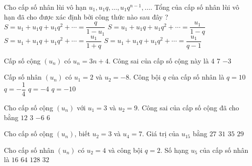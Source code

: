 \begin{ex}
Cho cấp số nhân lùi vô hạn $u_1, u_1q, \ldots, u_1q^{n-1},\ldots$. Tổng của cấp số nhân lùi vô hạn đã cho được xác định bởi công thức nào sau đây ? 
\choice
{$S=u_1+u_1q+u_1q^2+ \cdots=\dfrac{q}{1-u_1}$}
{\True $S=u_1+u_1q+u_1q^2+ \cdots=\dfrac{u_1}{1-q}$}
{$S=u_1+u_1q+u_1q^2+ \cdots=\dfrac{u_1}{1+q}$}
{$S=u_1+u_1q+u_1q^2+ \cdots=\dfrac{u_1}{q-1}$}
\end{ex}
\begin{ex}
Cấp số cộng $(u_n)$ có $u_n=3n+4$. Công sai của cấp số cộng này là
\choice
{4}
{}
{7}
{$-3$}
\end{ex}
\begin{ex}
    Cấp số nhân $(u_n)$ có $u_1=2$ và $u_2=-8$. Công bội $q$ của cấp số nhân là
\choice
{$q=10$}
{$q=-\dfrac{1}{4}$}
{\True $q=-4$}
{$q=-10$}
\end{ex}
\begin{ex}
Cho cấp số cộng $(u_n)$ với $u_1=3$ và $u_2=9$. Công sai của cấp số cộng đã cho bằng
\choice
{$12$}
{$3$}
{$-6$}
{\True $6$}
\end{ex}
\begin{ex}
Cho cấp số cộng $(u_n)$, biết $u_2=3$ và $u_4=7$. Giá trị của $u_{15}$ bằng
\choice
{$27$}
{$31$}
{$35$}
{\True $29$}
\end{ex}
\begin{ex}
Cho cấp số nhân $(u_n)$ có $u_2=4$ và công bội $q=2$. Số hạng $u_5$ của cấp số nhân là
\choice
{$16$}
{$64$}
{$128$}
{\True $32$}
\end{ex}
